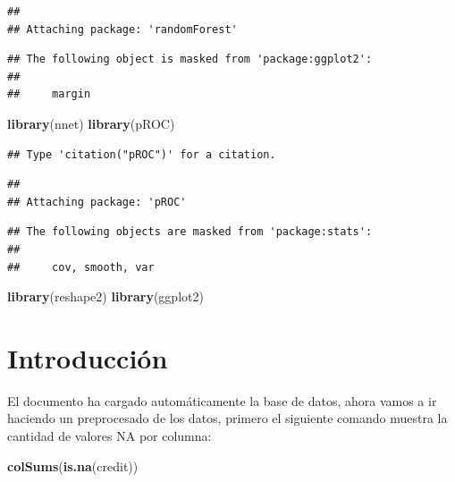 \documentclass[
]{article}
\newenvironment{Shaded}{\begin{snugshade}}{\end{snugshade}}
\newcommand{\FunctionTok}[1]{\textcolor[rgb]{0.13,0.29,0.53}{\textbf{#1}}}
\newcommand{\NormalTok}[1]{#1}
\begin{document}
\begin{verbatim}
## 
## Attaching package: 'randomForest'
\end{verbatim}

\begin{verbatim}
## The following object is masked from 'package:ggplot2':
## 
##     margin
\end{verbatim}

\begin{Shaded}
\begin{Highlighting}[]
\FunctionTok{library}\NormalTok{(nnet)}
\FunctionTok{library}\NormalTok{(pROC)}
\end{Highlighting}
\end{Shaded}

\begin{verbatim}
## Type 'citation("pROC")' for a citation.
\end{verbatim}

\begin{verbatim}
## 
## Attaching package: 'pROC'
\end{verbatim}

\begin{verbatim}
## The following objects are masked from 'package:stats':
## 
##     cov, smooth, var
\end{verbatim}

\begin{Shaded}
\begin{Highlighting}[]
\FunctionTok{library}\NormalTok{(reshape2)}
\FunctionTok{library}\NormalTok{(ggplot2)}
\end{Highlighting}
\end{Shaded}

\hypertarget{introducciuxf3n}{%
\section{Introducción}\label{introducciuxf3n}}

El documento ha cargado automáticamente la base de datos, ahora vamos a
ir haciendo un preprocesado de los datos, primero el siguiente comando
muestra la cantidad de valores NA por columna:

\begin{Shaded}
\begin{Highlighting}[]
\FunctionTok{colSums}\NormalTok{(}\FunctionTok{is.na}\NormalTok{(credit))}
\end{Highlighting}
\end{Shaded}
\end{document}
